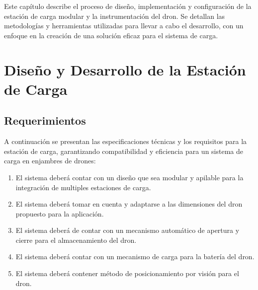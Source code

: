 
Este capítulo describe el proceso de diseño, implementación y configuración de la estación de carga modular y la instrumentación del dron. Se detallan las metodologías y herramientas utilizadas para llevar a cabo el desarrollo, con un enfoque en la creación de una solución eficaz para el sistema de carga.

\section{Diseño y Desarrollo de la Estación de Carga}

\subsection{Requerimientos}
    A continuación se presentan las especificaciones técnicas y los requisitos para la estación de carga, garantizando compatibilidad y eficiencia para un sistema de carga en enjambres de drones:
        \begin{enumerate}
            \item El sistema deberá contar con un diseño que sea modular y apilable para la integración de multiples estaciones de carga. 
            \item El sistema deberá tomar en cuenta y adaptarse a las dimensiones del dron propuesto para la aplicación.
            \item El sistema deberá de contar con un mecanismo automático de apertura y cierre para el almacenamiento del dron.
            \item El sistema deberá contar con un mecanismo de carga para la batería del dron.
            \item El sistema deberá contener método de posicionamiento por visión para el dron. 
        \end{enumerate}

